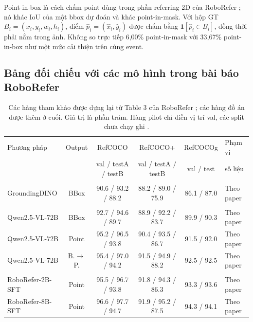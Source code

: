 \documentclass[11pt,a4paper]{article}
\renewcommand{\arraystretch}{1.18}
\newcommand{\NA}{\textemdash}
\newcommand{\pct}[1]{#1\%}
\begin{document}
Point-in-box là cách chấm point dùng trong phần referring 2D của RoboRefer
\cite{roborefer}; nó khác IoU của một bbox dự đoán và khác point-in-mask.
Với hộp GT $B_i=(x_i,y_i,w_i,h_i)$, điểm $\hat p_i=(\hat x_i,\hat y_i)$ được
chấm bằng $\mathbf{1}[\hat p_i\in B_i]$, đồng thời phải nằm trong ảnh.
Không so trực tiếp \pct{6,00} point-in-mask với \pct{33,67} point-in-box như
một mức cải thiện trên cùng event.

\begin{landscape}
\section{Bảng đối chiếu với các mô hình trong bài báo RoboRefer}
\begin{table}[H]\centering
\caption{Các hàng tham khảo được dựng lại từ Table 3 của RoboRefer
\cite{roborefer}; các hàng đồ án được thêm ở cuối. Giá trị là phần trăm.
Hàng pilot chỉ điền vị trí val, các split chưa chạy ghi \NA.}
\label{tab:paper-comparison}
\begingroup\small
\setlength{\tabcolsep}{4pt}
\renewcommand{\arraystretch}{1.24}
\begin{tabular}{P{6.0cm} c c c c P{2.6cm}}
\toprule
Phương pháp & Output & RefCOCO & RefCOCO+ & RefCOCOg & Phạm vi\\
 & & val / testA / testB & val / testA / testB & val / test & số liệu\\
\midrule
{}\\
GroundingDINO & BBox & 90.6 / 93.2 / 88.2 & 88.2 / 89.0 / 75.9 & 86.1 / 87.0 & Theo paper\\
\\
Qwen2.5-VL-72B & BBox & 92.7 / 94.6 / 89.7 & 88.9 / 92.2 / 83.7 & 89.9 / 90.3 & Theo paper\\
Qwen2.5-VL-72B & Point & 95.2 / 96.5 / 93.8 & 90.4 / 93.5 / 86.7 & 91.5 / 92.0 & Theo paper\\
Qwen2.5-VL-72B & B.$\to$P. & 95.4 / 97.0 / 94.2 & 91.5 / 94.9 / 88.2 & 92.5 / 92.5 & Theo paper\\
\\
RoboRefer-2B-SFT & Point & 95.5 / 96.7 / 93.8 & 91.8 / 94.3 / 86.3 & 93.3 / 93.6 & Theo paper\\
RoboRefer-8B-SFT & Point & 96.6 / 97.7 / 94.7 & 91.9 / 95.2 / 87.5 & 94.3 / 94.1 & Theo paper\\

\end{tabular}
\end{table}
\end{landscape}
\end{document}
